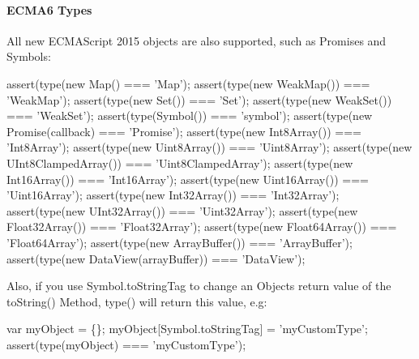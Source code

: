 \paragraph*{E\+C\+M\+A6 Types}

All new E\+C\+M\+A\+Script 2015 objects are also supported, such as Promises and Symbols\+:


\begin{DoxyCode}
assert(type(new Map() === 'Map');
assert(type(new WeakMap()) === 'WeakMap');
assert(type(new Set()) === 'Set');
assert(type(new WeakSet()) === 'WeakSet');
assert(type(Symbol()) === 'symbol');
assert(type(new Promise(callback) === 'Promise');
assert(type(new Int8Array()) === 'Int8Array');
assert(type(new Uint8Array()) === 'Uint8Array');
assert(type(new UInt8ClampedArray()) === 'Uint8ClampedArray');
assert(type(new Int16Array()) === 'Int16Array');
assert(type(new Uint16Array()) === 'Uint16Array');
assert(type(new Int32Array()) === 'Int32Array');
assert(type(new UInt32Array()) === 'Uint32Array');
assert(type(new Float32Array()) === 'Float32Array');
assert(type(new Float64Array()) === 'Float64Array');
assert(type(new ArrayBuffer()) === 'ArrayBuffer');
assert(type(new DataView(arrayBuffer)) === 'DataView');
\end{DoxyCode}


Also, if you use {\ttfamily Symbol.\+to\+String\+Tag} to change an Objects return value of the {\ttfamily to\+String()} Method, {\ttfamily type()} will return this value, e.\+g\+:


\begin{DoxyCode}
var myObject = \{\};
myObject[Symbol.toStringTag] = 'myCustomType';
assert(type(myObject) === 'myCustomType');
\end{DoxyCode}
 